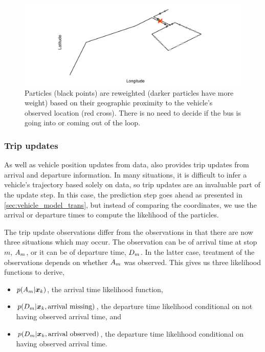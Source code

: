 \begin{knitrout}\small
{}\color{fgcolor}\begin{figure}

{\centering \includegraphics[width=\maxwidth]{figure/pf_wts-1} 

}

\caption[Particles are reweighted based on their geographic proximity to the vehicle's observed location]{Particles (black points) are reweighted (darker particles have more weight) based on their geographic proximity to the vehicle's observed location (red cross). There is no need to decide if the bus is going into or coming out of the loop.}\label{fig:pf_wts}
\end{figure}


\end{knitrout}


\subsubsection{Trip updates}
\label{sec:lhood_trip}

As well as vehicle position updates from \GPS{} data, \GTFS{} also provides trip updates from arrival and departure information. In many situations, it is difficult to infer a vehicle's trajectory based solely on \GPS{} data, so trip updates are an invaluable part of the update step. In this case, the \pf{} prediction step goes ahead as presented in \cref{sec:vehicle_model_trans}, but instead of comparing the coordinates, we use the arrival or departure times to compute the likelihood of the particles.


The trip update observations differ from the \GPS{} observations in that there are now three situations which may occur. The observation can be of arrival time at stop $m$, $A_m$, or it can be of departure time, $D_m$. In the latter case, treatment of the observations depends on whether $A_m$ was observed. This gives us three likelihood functions to derive,
\begin{itemize}
\item $p(A_m | \boldsymbol x_k)$, the arrival time likelihood function,
\item $p(D_m | \boldsymbol x_k, \text{arrival missing})$, the departure time likelihood conditional on not having observed arrival time, and
\item $p(D_m | \boldsymbol x_k, \text{arrival observed})$, the departure time likelihood conditional on having observed arrival time.
\end{itemize}


